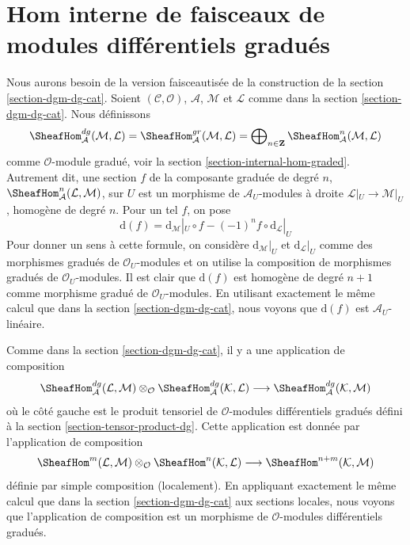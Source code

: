 \section{Hom interne de faisceaux de modules différentiels gradués}
\label{section-internal-hom-dg}

\noindent
Nous aurons besoin de la version faisceautisée de la construction de la
section \ref{section-dgm-dg-cat}. Soient
$(\mathcal{C}, \mathcal{O})$, $\mathcal{A}$,
$\mathcal{M}$ et $\mathcal{L}$ comme dans la section \ref{section-dgm-dg-cat}. Nous
définissons
$$
\SheafHom^{dg}_\mathcal{A}(\mathcal{M}, \mathcal{L}) =
\SheafHom^{gr}_\mathcal{A}(\mathcal{M}, \mathcal{L}) =
\bigoplus\nolimits_{n \in \mathbf{Z}}
\SheafHom^n_\mathcal{A}(\mathcal{M}, \mathcal{L})
$$ comme
$\mathcal{O}$-module gradué, voir la section
\ref{section-internal-hom-graded}. Autrement dit, une section
$f$ de la composante graduée de degré $n$,
$\SheafHom^n_\mathcal{A}(\mathcal{L}, \mathcal{M})$, sur $U$ est un morphisme de
$\mathcal{A}_U$-modules à droite
$\mathcal{L}|_U \to \mathcal{M}|_U$, homogène de degré $n$. Pour un tel
$f$, on pose
$$
\text{d}(f) =
\text{d}_\mathcal{M}|_U \circ f - (-1)^n f \circ \text{d}_\mathcal{L}|_U
$$ Pour donner un sens à cette formule,
on considère $\text{d}_\mathcal{M}|_U$ et
$\text{d}_\mathcal{L}|_U$ comme des morphismes gradués de $\mathcal{O}_U$-modules et on utilise la
composition de morphismes gradués de $\mathcal{O}_U$-modules. Il est
clair que $\text{d}(f)$ est homogène de degré
$n + 1$ comme morphisme gradué de $\mathcal{O}_U$-modules. En
utilisant exactement le même calcul que dans la section \ref{section-dgm-dg-cat},
nous voyons que $\text{d}(f)$ est $\mathcal{A}_U$-linéaire.

\medskip\noindent
Comme dans la section \ref{section-dgm-dg-cat}, il y a une application de
composition $$
\SheafHom^{dg}_\mathcal{A}(\mathcal{L}, \mathcal{M}) \otimes_\mathcal{O}
\SheafHom^{dg}_\mathcal{A}(\mathcal{K}, \mathcal{L})
\longrightarrow
\SheafHom^{dg}_\mathcal{A}(\mathcal{K}, \mathcal{M})
$$ où le
côté gauche est le produit tensoriel de
$\mathcal{O}$-modules différentiels gradués défini à la section
\ref{section-tensor-product-dg}. Cette application est donnée
par l'application de composition
$$
\SheafHom^m(\mathcal{L}, \mathcal{M}) \otimes_\mathcal{O}
\SheafHom^n(\mathcal{K}, \mathcal{L}) \longrightarrow
\SheafHom^{n + m}(\mathcal{K}, \mathcal{M})
$$ définie par simple
composition (localement). En appliquant exactement le même calcul
que dans la section \ref{section-dgm-dg-cat} aux sections locales, nous voyons
que l'application de composition est un morphisme de
$\mathcal{O}$-modules différentiels gradués.

